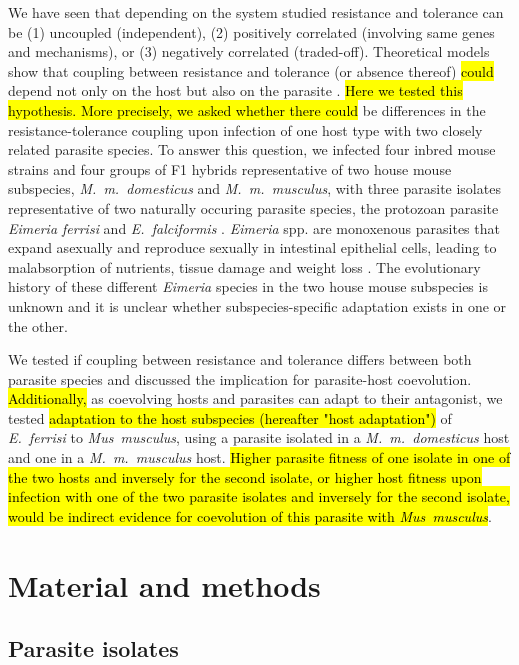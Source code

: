 \documentclass[12pt]{article}
\begin{document}
We have seen that depending on the system studied resistance and tolerance can be (1) uncoupled (independent), (2) positively correlated (involving same genes and mechanisms), or (3) negatively correlated (traded-off). Theoretical models show that coupling between resistance and tolerance (or absence thereof) \hl{could} depend not only on the host but also on the parasite \citep{Carval2010}. \hl{Here we tested this hypothesis. More precisely, we asked whether there could} be differences in the resistance-tolerance coupling upon infection of one host type with two closely related parasite species. To answer this question, we infected four inbred mouse strains and four groups of F1 hybrids representative of two house mouse subspecies, \textit{M.~m.~domesticus} and \textit{M.~m.~musculus}, with three parasite isolates representative of two naturally occuring parasite species, the protozoan parasite \textit{Eimeria ferrisi} and \textit{E.~falciformis }\citep{jarquin-diaz_detection_2019}. \textit{Eimeria }spp. are monoxenous parasites that expand asexually and reproduce sexually in intestinal epithelial cells, leading to malabsorption of nutrients, tissue damage and weight loss \citep{chapman_chapter_2013}. The evolutionary history of these different \textit{Eimeria} species in the two house mouse subspecies is unknown and it is unclear whether subspecies-specific adaptation exists in one or the other. 

\par
We tested if coupling between resistance and tolerance differs between both parasite species and discussed the implication for parasite-host coevolution. \hl{Additionally,} as coevolving hosts and parasites can adapt to their antagonist, we tested \hl{adaptation to the host subspecies (hereafter "host adaptation")} of \textit{E.~ferrisi} to \textit{Mus~musculus}, using a parasite isolated in a \textit{M.~m.~domesticus} host and one in a \textit{M.~m.~musculus} host. \hl{Higher parasite fitness of one isolate in one of the two hosts and inversely for the second isolate, or higher host fitness upon infection with one of the two parasite isolates and inversely for the second isolate, would be indirect evidence for coevolution of this parasite with \textit{Mus~musculus}}. 

\section*{Material and methods}

\subsection{Parasite isolates}
\end{document}
